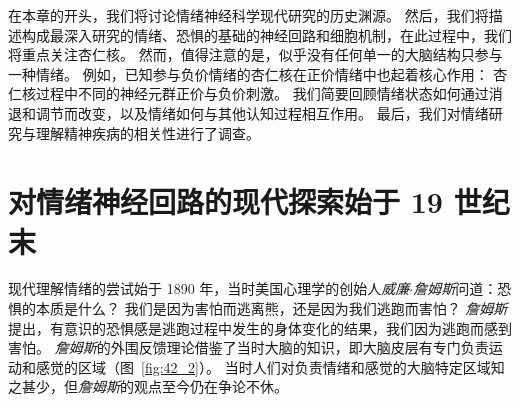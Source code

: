 在本章的开头，我们将讨论情绪神经科学现代研究的历史渊源。
然后，我们将描述构成最深入研究的情绪、恐惧的基础的神经回路和细胞机制，在此过程中，我们将重点关注杏仁核。
然而，值得注意的是，似乎没有任何单一的大脑结构只参与一种情绪。
例如，已知参与负价情绪的杏仁核在正价情绪中也起着核心作用：
杏仁核过程中不同的神经元群正价与负价刺激。
我们简要回顾情绪状态如何通过消退和调节而改变，以及情绪如何与其他认知过程相互作用。
最后，我们对情绪研究与理解精神疾病的相关性进行了调查。



\section{对情绪神经回路的现代探索始于 19 世纪末}
现代理解情绪的尝试始于 1890 年，当时美国心理学的创始人\textit{威廉$\cdot$詹姆斯}问道：恐惧的本质是什么？
我们是因为害怕而逃离熊，还是因为我们逃跑而害怕？
\textit{詹姆斯}提出，有意识的恐惧感是逃跑过程中发生的身体变化的结果，我们因为逃跑而感到害怕。
\textit{詹姆斯}的外围反馈理论借鉴了当时大脑的知识，即大脑皮层有专门负责运动和感觉的区域（图~\ref{fig:42_2}）。
当时人们对负责情绪和感觉的大脑特定区域知之甚少，但\textit{詹姆斯}的观点至今仍在争论不休。


